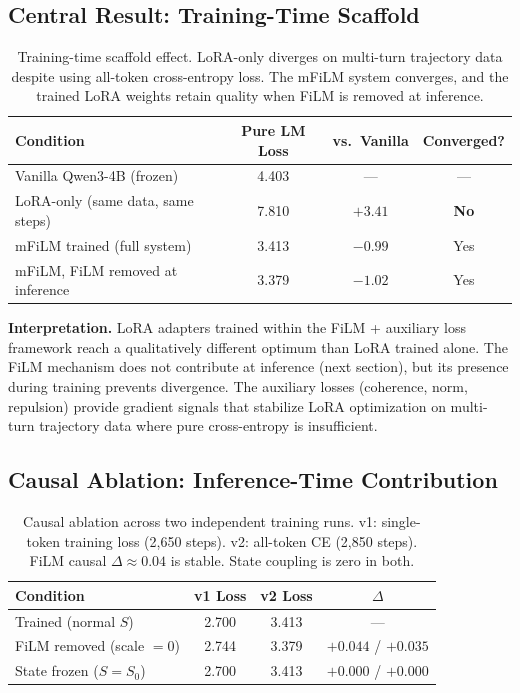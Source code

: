 \documentclass[11pt,a4paper]{article}
\begin{document}
\subsection{Central Result: Training-Time Scaffold}
\label{sec:scaffold}

\begin{table}[h]
\centering
\begin{tabular}{lccc}
\toprule
\textbf{Condition} & \textbf{Pure LM Loss} & \textbf{vs.\ Vanilla} & \textbf{Converged?} \\
\midrule
Vanilla Qwen3-4B (frozen)         & 4.403 & ---     & --- \\
LoRA-only (same data, same steps) & 7.810 & $+3.41$ & \textbf{No} \\
mFiLM trained (full system)       & 3.413 & $-0.99$ & Yes \\
mFiLM, FiLM removed at inference  & 3.379 & $-1.02$ & Yes \\
\bottomrule
\end{tabular}
\caption{Training-time scaffold effect. LoRA-only diverges on multi-turn trajectory
data despite using all-token cross-entropy loss. The mFiLM system converges, and
the trained LoRA weights retain quality when FiLM is removed at inference.}
\end{table}

\textbf{Interpretation.} LoRA adapters trained within the FiLM + auxiliary loss
framework reach a qualitatively different optimum than LoRA trained alone. The
FiLM mechanism does not contribute at inference (next section), but its presence
during training prevents divergence. The auxiliary losses (coherence, norm,
repulsion) provide gradient signals that stabilize LoRA optimization on multi-turn
trajectory data where pure cross-entropy is insufficient.

\subsection{Causal Ablation: Inference-Time Contribution}

\begin{table}[h]
\centering
\begin{tabular}{lccc}
\toprule
\textbf{Condition} & \textbf{v1 Loss} & \textbf{v2 Loss} & $\Delta$ \\
\midrule
Trained (normal $S$)     & 2.700 & 3.413 & --- \\
FiLM removed (scale $=0$) & 2.744 & 3.379 & $+0.044$ / $+0.035$ \\
State frozen ($S = S_0$) & 2.700 & 3.413 & $+0.000$ / $+0.000$ \\
\bottomrule
\end{tabular}
\caption{Causal ablation across two independent training runs. v1: single-token
training loss (2,650 steps). v2: all-token CE (2,850 steps). FiLM causal
$\Delta \approx 0.04$ is stable. State coupling is zero in both.}
\end{table}
\end{document}
